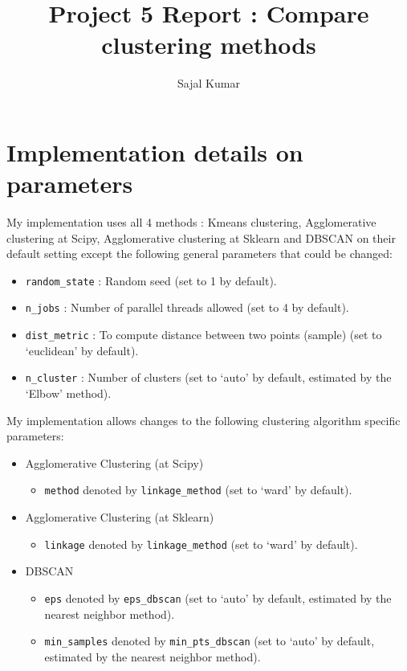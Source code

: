 \documentclass[12pt]{article}
\title{\textbf{Project 5 Report : Compare clustering methods}}
\author{Sajal Kumar}
\date{}
\begin{document}
\maketitle

\section*{Implementation details on parameters}

My implementation uses all 4 methods : Kmeans clustering, Agglomerative clustering at Scipy, Agglomerative clustering at Sklearn and DBSCAN on their default setting except the following general parameters that could be changed:

\begin{itemize}
\item \texttt{random\_state} : Random seed (set to 1 by default).
\item \texttt{n\_jobs} : Number of parallel threads allowed (set to 4 by default).
\item \texttt{dist\_metric} : To compute distance between two points (sample) (set to `euclidean' by default).
\item \texttt{n\_cluster} : Number of clusters (set to `auto' by default, estimated by the `Elbow' method).
\end{itemize}

My implementation allows changes to the following clustering algorithm specific parameters:

\begin{itemize}
\item Agglomerative Clustering (at Scipy)
\begin{itemize}
\item \texttt{method} denoted by \texttt{linkage\_method} (set to `ward' by default).
\end{itemize}
\item Agglomerative Clustering (at Sklearn)
\begin{itemize}
\item \texttt{linkage} denoted by \texttt{linkage\_method} (set to `ward' by default).
\end{itemize}
\item DBSCAN
\begin{itemize}
\item \texttt{eps} denoted by \texttt{eps\_dbscan} (set to `auto' by default, estimated by the nearest neighbor method).
\item \texttt{min\_samples} denoted by \texttt{min\_pts\_dbscan} (set to `auto' by default, estimated by the nearest neighbor method).
\end{itemize}
\end{itemize}
\end{document}
